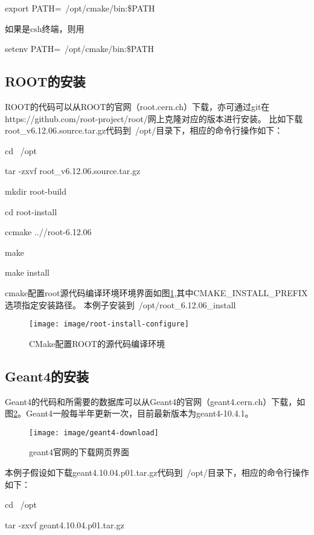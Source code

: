export PATH=~/opt/cmake/bin:\$PATH  %

如果是csh终端，则用

setenv PATH=~/opt/cmake/bin:\$PATH


\subsection{ROOT的安装}
ROOT的代码可以从ROOT的官网（root.cern.ch）下载，亦可通过git在https://github.com/root-project/root/网上克隆对应的版本进行安装。
比如下载root\_v6.12.06.source.tar.gz代码到~/opt/目录下，相应的命令行操作如下：

cd ~/opt

tar -zxvf root\_v6.12.06.source.tar.gz  %

mkdir root-build

cd root-install

ccmake ..//root-6.12.06  %

make  %

make install   %

cmake配置root源代码编译环境环境界面如图\ref{fig:root-install-configure},其中CMAKE\_INSTALL\_PREFIX选项指定安装路径。
本例子安装到~/opt/root\_6.12.06\_install
\begin{figure}[H]
	\centering
	\texttt{[image: image/root-install-configure]}
	\caption{CMake配置ROOT的源代码编译环境}
	\label{fig:root-install-configure}
\end{figure}



\subsection{Geant4的安装}
Geant4的代码和所需要的数据库可以从Geant4的官网（geant4.cern.ch）下载，如图\ref{fig:geant4-download}。Geant4一般每半年更新一次，目前最新版本为geant4-10.4.1。

\begin{figure}[H]
	\centering
	\texttt{[image: image/geant4-download]}
	\caption{geant4官网的下载网页界面}
	\label{fig:geant4-download}
\end{figure}


本例子假设如下载geant4.10.04.p01.tar.gz代码到~/opt/目录下，相应的命令行操作如下：

cd ~/opt

tar -zxvf geant4.10.04.p01.tar.gz  %

